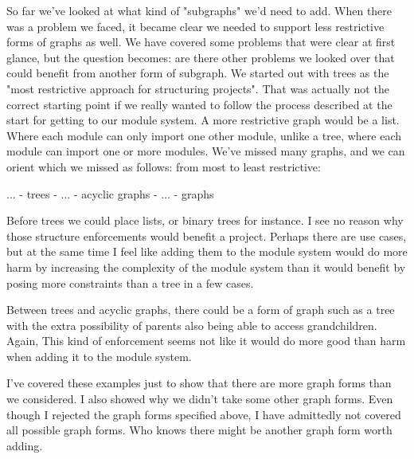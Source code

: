 \documentclass{article}
\begin{document}
So far we've looked at what kind of "subgraphs" we'd need to add. When there was a problem we faced, it became clear we needed to support less restrictive forms of graphs as well. We have covered some problems that were clear at first glance, but the question becomes: are there other problems we looked over that could benefit from another form of subgraph. We started out with trees as the "most restrictive approach for structuring projects". That was actually not the correct starting point if we really wanted to follow the process described at the start for getting to our module system. A more restrictive graph would be a list. Where each module can only import one other module, unlike a tree, where each module can import one or more modules. We've missed many graphs, and we can orient which we missed as follows:
from most to least restrictive:

... - trees - ... - acyclic graphs - ... - graphs

Before trees we could place lists, or binary trees for instance. I see no reason why those structure enforcements would benefit a project. Perhaps there are use cases, but at the same time I feel like adding them to the module system would do more harm by increasing the complexity of the module system than it would benefit by posing more constraints than a tree in a few cases.

Between trees and acyclic graphs, there could be a form of graph such as a tree with the extra possibility of parents also being able to access grandchildren. Again, This kind of enforcement seems not like it would do more good than harm when adding it to the module system.


I've covered these examples just to show that there are more graph forms than we considered. I also showed why we didn't take some other graph forms. Even though I rejected the graph forms specified above, I have admittedly not covered all possible graph forms. Who knows there might be another graph form worth adding.


\end{document}
